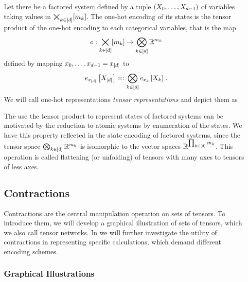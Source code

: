 \begin{definition}
	Let there be a factored system defined by a tuple $(X_{0},\ldots,X_{d-1})$ of variables taking values in $\bigtimes_{k\in[d]}[m_{k}]$.
	The one-hot encoding of its states is the tensor product of the one-hot encoding to each categorical variables, that is the map
		\[ e : \bigtimes_{k\in[d]}[m_{k}] \rightarrow  \bigotimes_{k\in[d]} \mathbb{R}^{m_{k}} \]
	defined by mapping $x_{0},\ldots,x_{d-1}=x_{[d]}$ to
	\begin{align*}
		 e_{x_{[d]}}\left[X_{[d]}\right]
		=: \bigotimes_{k\in[d]} e_{x_{k}}\left[X_{k}\right] \, . 
	\end{align*}
	We will call one-hot representations \emph{tensor representations} and depict them as
	\begin{center}
		
	\end{center}
\end{definition}


\begin{remark}
	The use the tensor product to represent states of factored systems can be motivated by the reduction to atomic systems by enumeration of the states.
	We have this property reflected in the state encoding of factored systems, since the tensor space $\bigotimes_{k\in[d]}\mathbb{R}^{m_{k}}$ is isomorphic to the vector spaces $\mathbb{R}^{\prod_{k\in[d]}m_{k}}$.
	This operation is called flattening (or unfolding) of tensors with many axes to tensors of less axes.
\end{remark}



\subsection{Contractions}

Contractions are the central manipulation operation on sets of tensors.
To introduce them, we will develop a graphical illustration of sets of tensors, which we also call tensor networks.
In  we will further investigate the utility of contractions in representing specific calculations, which demand different encoding schemes.


\subsubsection{Graphical Illustrations}

